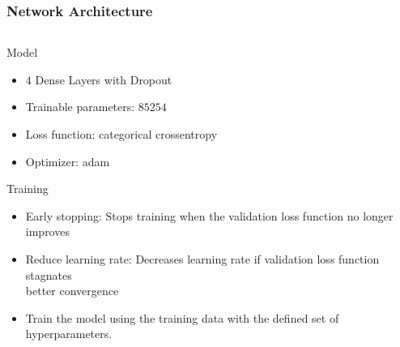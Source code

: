 \begin{frame}
    \frametitle{Network Architecture}
    
    \begin{columns}[T]
        \begin{column}{0.7\textwidth}
            \begin{alertblock}{Model}
                \begin{itemize}
                    \item $\num{4}$ Dense Layers with Dropout
                    \item Trainable parameters: $\num{85254}$
                    \item Loss function: categorical crossentropy
                    \item Optimizer: adam
                \end{itemize}    
            \end{alertblock}
            \begin{alertblock}{Training}
                \begin{itemize}
                    \item Early stopping: Stops training when the validation loss function no longer improves
                    \item Reduce learning rate: Decreases learning rate if validation loss function stagnates \\
                    \to better convergence
                    \item Train the model using the training data with the defined set of hyperparameters.
                \end{itemize}  
            \end{alertblock}
        \end{column}
        \begin{column}{0.3\textwidth}
\end{column}
\end{columns}
\end{frame}
